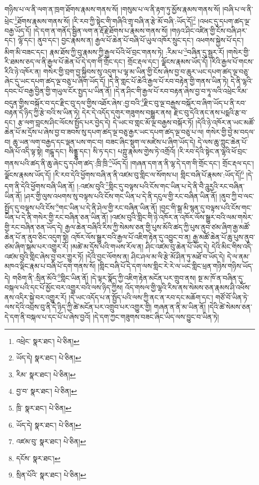 གཉིས་པ་ལ་ནི་ལག་ན་ཁྲག་ཐོགས་རྣམས་གནས་སོ། །གསུམ་པ་ལ་ནི་རྟག་ཏུ་མྱོས་རྣམས་གནས་སོ། །བཞི་པ་ལ་ནི་ཕྲེང་\footnote{འཕྲེང་  སྣར་ཐང་།  པེ་ཅིན། }ཐོགས་རྣམས་གནས་སོ། །རི་རབ་ཀྱི་སྟེང་གི་གཞིའི་གྲྭ་བཞི་ན་རྩེ་མོ་བཞི་:ཡོད་དོ།\footnote{ཡོད་དེ།  སྣར་ཐང་།  པེ་ཅིན། } །འཕང་དུ་དཔག་ཚད་ལྔ་བརྒྱ་ཡོད་དོ། །དེ་དག་ན་གནོད་སྦྱིན་ལག་ན་རྡོ་རྗེ་ཐོགས་པ་རྣམས་གནས་སོ། །གཉའ་ཤིང་འཛིན་གྱི་ངོས་བཞི་ཤར་དང་། ལྷོ་དང་། ནུབ་དང་། བྱང་རྣམས་ན། རྒྱལ་པོ་ཆེན་པོ་བཞི་པོ་ཡུལ་འཁོར་སྲུང་དང་། འཕགས་སྐྱེས་པོ་དང་། མིག་མི་བཟང་དང་། རྣམ་ཐོས་ཀྱི་བུ་རྣམས་ཀྱི་རྒྱལ་པོའི་ཕོ་བྲང་གནས་ཏེ། :རིམ་པ་\footnote{རིམ་  སྣར་ཐང་།  པེ་ཅིན། }བཞིན་དུ་སྦྱར་རོ། །གསེར་གྱི་རི་ཐམས་ཅད་ལ་ནི་རྒྱལ་པོ་ཆེན་པོ་དེ་དག་གི་གྲོང་དང་། གྲོང་རྡལ་དང་། ལྗོངས་རྣམས་ཡོད་དོ། །རིའི་རྒྱལ་པོ་གངས་རིའི་ཉེ་འཁོར་ན། གསེར་གྱི་བྲག་བྱ་སྐྱིབས་སུ་འདུག་པ་ལྷ་མ་ཡིན་གྱི་ངོས་ཞེས་བྱ་བ་ཆུར་ཡང་དཔག་ཚད་ལྔ་བཅུ་ཞེང་དུ་ཡང་དཔག་ཚད་ལྔ་བཅུ་པ་ཞིག་ཡོད་དོ། །དེ་ནི་གླང་པོ་ཆེའི་རྒྱལ་པོ་རབ་བརྟེན་གྱི་གནས་ཡིན་ཏེ། དེ་ནི་ལྷའི་དབང་པོ་བརྒྱ་བྱིན་གྱི་གཡུལ་ངོར་སྤྱད་པ་ཡིན་ནོ། །དེ་ན་ཤིང་གི་རྒྱལ་པོ་རབ་བརྟན་ཞེས་བྱ་བ་ཏཱ་ལའི་འཕྲེང་རིམ་བདུན་གྱིས་བསྐོར་བ་དང་རྫིང་བུ་དལ་གྱིས་འཐོར་ཞེས་:བྱ་བའི་\footnote{བྱ་བ་  སྣར་ཐང་།  པེ་ཅིན། }རྫིང་བུ་ལྔ་བརྒྱས་བསྐོར་བ་ཞིག་ཡོད་པ་ནི་རབ་བརྟན་དེ་ཉིད་ཀྱི་རྩེ་བའི་ས་ཡིན་ཏེ། དེར་དེ་འདོད་དགུར་གཟུགས་བསྒྱུར་ནས། རྫིང་བུ་དེའི་ནང་ནས་པདྨའི་རྩ་བ་དང་། རྩ་ལག་བླངས་ཤིང་ལོངས་སྤྱོད་པར་བྱེད་དེ། དེ་ཡང་བ་གླང་མོ་ལྔ་བརྒྱས་བསྐོར་ཏོ། །དེའི་ཉེ་འཁོར་ན་ཡང་མཚོ་ཆེན་པོ་མ་དྲོས་པ་ཞེས་བྱ་བ་ཟབས་སུ་དཔག་ཚད་ལྔ་བཅུ་རྒྱར་ཡང་དཔག་ཚད་ལྔ་བཅུ་པ་ལ། གསེར་གྱི་བྱེ་མ་བདལ་བ། ཆུ་ཡན་ལག་བརྒྱད་དང་ལྡན་པས་གང་བ། བཟང་ཞིང་སྡུག་ལ་མཛེས་པ་ཞིག་ཡོད་དེ། དེ་ལས་ཆུ་ཀླུང་ཆེན་པོ་བཞི་པོ་འདི་ལྟ་སྟེ། གངྒཱ་དང་། སིནྡྷུ་དང་། སི་ཏ་དང་། པཀྵུ་རྣམས་གྱེས་ཏེ་འགྲོའོ། །རི་རབ་དེའི་སྟེང་ན་ལྷའི་ཕོ་བྲང་གནས་པའི་ཚད་ནི་ཆུ་ཞེང་དུ་དཔག་ཚད་:ཁྲི་ཁྲི་\footnote{ཁྲི་  སྣར་ཐང་།  པེ་ཅིན། }ཡོད་དོ། །གཞན་དག་ན་ནི་ལྷ་དེ་དག་གི་གྲོང་དང་། གྲོང་རྡལ་དང་། ལྗོངས་རྣམས་ཡོད་དོ། །རི་རབ་དེའི་ཕྱོགས་བཞི་ན་ནི་འཛམ་བུ་གླིང་ལ་སོགས་པ། གླིང་བཞི་པོ་རྣམས་:ཡོད་དོ།\footnote{ཡོད་དེ།  སྣར་ཐང་།  པེ་ཅིན། } །དེ་དག་ནི་དེའི་ཕྱོགས་བཞི་ཡིན་ནོ། །:འཛམ་བུའི་\footnote{འཛམ་བུ་  སྣར་ཐང་།  པེ་ཅིན། }གླིང་དུ་བལྟས་པའི་ངོས་གང་ཡིན་པ་དེ་ནི་བཻ་ཌཱུརྱའི་རང་བཞིན་ཡིན་ནོ། །ཤར་གྱི་ལུས་འཕགས་སུ་བལྟས་པའི་ངོས་གང་ཡིན་པ་དེ་ནི་དངུལ་གྱི་རང་བཞིན་ཡིན་ནོ། །ནུབ་ཀྱི་བ་ལང་སྤྱོད་དུ་བལྟས་པའི་ངོས་\footnote{དངོས་  སྣར་ཐང་། }གང་ཡིན་པ་དེ་ནི་ཤེལ་གྱི་རང་བཞིན་ཡིན་ནོ། །བྱང་གི་སྒྲ་མི་སྙན་དུ་བལྟས་པའི་ངོས་གང་ཡིན་པ་དེ་ནི་གསེར་གྱི་རང་བཞིན་ཅན་ཡིན་ནོ། །འཛམ་བུའི་གླིང་གི་ཉེ་འཁོར་ན་འཁོར་ལོས་སྒྱུར་བའི་ལམ་གསེར་གྱི་རང་བཞིན་ཅན་ཡོད་དེ། རྒྱལ་ཆེན་བཞིའི་རིས་ཀྱི་སེམས་ཅན་གྱི་པུས་མོའི་ཚད་ཀྱི་པུས་ནུབ་ཙམ་ཞིག་རྒྱ་མཚོ་ཆེན་པོ་ན་ནུབ་ཅིང་འདུག་སྟེ། འཁོར་ལོས་སྒྱུར་བའི་རྒྱལ་པོ་འཇིག་རྟེན་དུ་འབྱུང་བ་ན། རྒྱ་མཚོ་ཆེན་པོ་ཆུ་པུས་ནུབ་ཙམ་ཞིག་སྐམ་པར་འགྱུར་རོ། །མཚེ་མ་དྲོས་པའི་གཡས་རོལ་ན། ཤིང་འཛམ་བུ་ཆེན་པོ་ཡོད་དེ། དེའི་མིང་གིས་འདི་འཛམ་བུའི་གླིང་ཞེས་བྱ་བར་གྱུར་ཏོ། །དེའི་བྱང་ལོགས་ན། ཤིང་ཤལ་མ་ལི་རྩེ་མོ་ཤིན་ཏུ་མཐོ་བ་ཡོད་དེ། དེ་ལ་ནམ་མཁའ་ལྡིང་རྣམ་པ་བཞི་པོ་དག་གནས་སོ། །གླིང་བཞི་པོ་དེ་དག་ལས་གླིང་རེ་རེ་ལ་ཡང་གླིང་ཕྲན་གཉིས་གཉིས་ཡོད་དེ། གཅིག་ནི་:སྲིན་མོའི་\footnote{སྲིན་པོའི་  སྣར་ཐང་།  པེ་ཅིན། }གླིང་ཡིན་ནོ། །དེ་ལྟར་སྣོད་ཀྱི་འཇིག་རྟེན་མངོན་པར་གྲུབ་ནས། སྔ་མ་ཁོ་ན་བཞིན་དུ་བསྐལ་པའི་དང་པོ་མྱོང་བར་འགྱུར་བའི་ལས་ཉིད་ཀྱིས། འོད་གསལ་གྱི་ལྷའི་རིས་ནས་སེམས་ཅན་རྣམས་ཤི་འཕོས་ནས་འདིར་སྐྱེ་བར་འགྱུར་རོ། །དེ་ཡང་འདོད་པ་ན་སྤྱོད་པའི་ལས་ཀྱི་ནང་ན་རབ་དང་མཆོག་དང་། གཙོ་བོ་ཡིན་ཏེ་ལས་དེའི་འབྲས་བུ་ནི་དེ་ཉིད་ཀྱི་ཚེ་མངོན་པར་འགྲུབ་པར་འགྱུར་གྱི། གཞན་ན་ནི་མ་ཡིན་ནོ། །དེའི་ཚེ་སེམས་ཅན་དེ་དག་ནི་བསྐལ་པ་དང་པོ་པ་ཞེས་བྱའོ། །དེ་དག་ཀྱང་གཟུགས་བཟང་ཞིང་ཡིད་ལས་བྱུང་བ་ཡིན་ཏེ། 